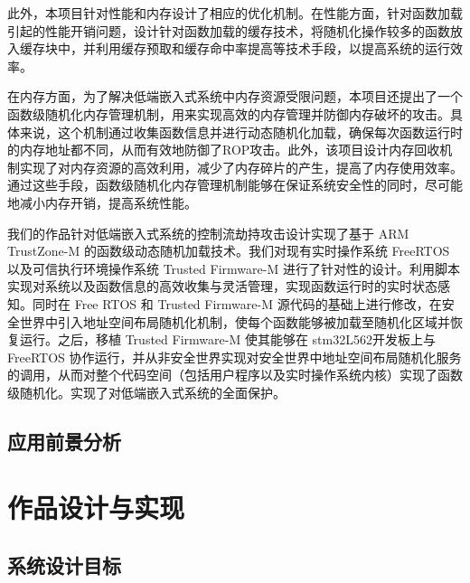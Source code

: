 \documentclass[12pt,a4paper]{ctexart}
\numberwithin{figure}{section}
\begin{document}
\par 此外，本项目针对性能和内存设计了相应的优化机制。在性能方面，针对函数加载引起的性能开销问题，设计针对函数加载的缓存技术，将随机化操作较多的函数放入缓存块中，并利用缓存预取和缓存命中率提高等技术手段，以提高系统的运行效率。
\par 在内存方面，为了解决低端嵌入式系统中内存资源受限问题，本项目还提出了一个函数级随机化内存管理机制，用来实现高效的内存管理并防御内存破坏的攻击。具体来说，这个机制通过收集函数信息并进行动态随机化加载，确保每次函数运行时的内存地址都不同，从而有效地防御了ROP攻击。此外，该项目设计内存回收机制实现了对内存资源的高效利用，减少了内存碎片的产生，提高了内存使用效率。通过这些手段，函数级随机化内存管理机制能够在保证系统安全性的同时，尽可能地减小内存开销，提高系统性能。
\par 我们的作品针对低端嵌入式系统的控制流劫持攻击设计实现了基于 ARM TrustZone-M 的函数级动态随机加载技术。我们对现有实时操作系统 FreeRTOS 以及可信执行环境操作系统 Trusted Firmware-M 进行了针对性的设计。利用脚本实现对系统以及函数信息的高效收集与灵活管理，实现函数运行时的实时状态感知。同时在 Free RTOS 和 Trusted Firmware-M 源代码的基础上进行修改，在安全世界中引入地址空间布局随机化机制，使每个函数能够被加载至随机化区域并恢复运行。之后，移植 Trusted Firmware-M 使其能够在 stm32L562开发板上与 FreeRTOS 协作运行，并从非安全世界实现对安全世界中地址空间布局随机化服务的调用，从而对整个代码空间（包括用户程序以及实时操作系统内核）实现了函数级随机化。实现了对低端嵌入式系统的全面保护。

\subsection{应用前景分析}

\section{作品设计与实现}
\subsection{系统设计目标}
\end{document}
